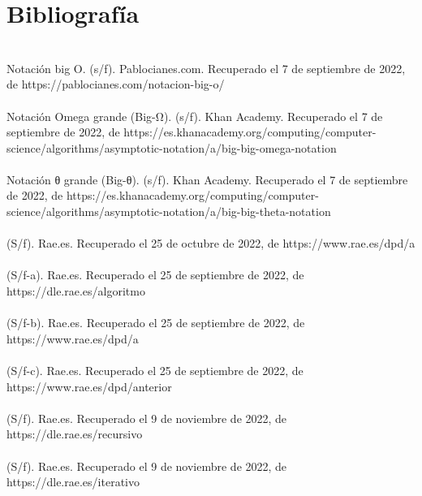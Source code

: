 \documentclass[12pt,twoside]{article}
\begin{document}
\section{Bibliograf\'ia}
\\
Notación big O. (s/f). Pablocianes.com. Recuperado el 7 de septiembre de 2022, de https://pablocianes.com/notacion-big-o/
\\
\\
Notación Omega grande (Big-Ω). (s/f). Khan Academy. Recuperado el 7 de septiembre de 2022, de https://es.khanacademy.org/computing/computer-science/algorithms/asymptotic-notation/a/big-big-omega-notation
\\
\\
Notación θ grande (Big-θ). (s/f). Khan Academy. Recuperado el 7 de septiembre de 2022, de https://es.khanacademy.org/computing/computer-science/algorithms/asymptotic-notation/a/big-big-theta-notation
\\
\\
(S/f). Rae.es. Recuperado el 25 de octubre de 2022, de https://www.rae.es/dpd/a%
\\
\\
(S/f-a). Rae.es. Recuperado el 25 de septiembre de 2022, de https://dle.rae.es/algoritmo
\\
\\
(S/f-b). Rae.es. Recuperado el 25 de septiembre de 2022, de https://www.rae.es/dpd/a%
\\
\\
(S/f-c). Rae.es. Recuperado el 25 de septiembre de 2022, de https://www.rae.es/dpd/anterior
\\
\\
(S/f). Rae.es. Recuperado el 9 de noviembre de 2022, de https://dle.rae.es/recursivo
\\
\\
(S/f). Rae.es. Recuperado el 9 de noviembre de 2022, de https://dle.rae.es/iterativo
\\
\\

\medskip
\end{document}
